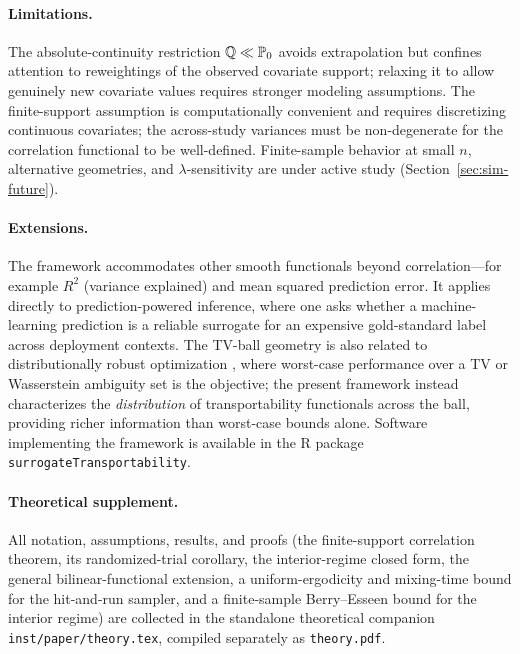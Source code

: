 \documentclass{article}
\newcommand{\PP}{\mathbb{P}}
\begin{document}
\paragraph{Limitations.}
The absolute-continuity restriction $\Q \ll \PP_0$ avoids extrapolation but
confines attention to reweightings of the observed covariate support; relaxing it
to allow genuinely new covariate values requires stronger modeling assumptions.
The finite-support assumption is computationally convenient and requires
discretizing continuous covariates; the across-study variances must be
non-degenerate for the correlation functional to be well-defined. Finite-sample
behavior at small $n$, alternative geometries, and $\lambda$-sensitivity are under
active study (Section~\ref{sec:sim-future}).

\paragraph{Extensions.}
The framework accommodates other smooth functionals beyond correlation---for
example $R^2$ (variance explained) and mean squared prediction error. It applies
directly to prediction-powered inference, where one asks whether a machine-learning
prediction is a reliable surrogate for an expensive gold-standard label across
deployment contexts. The TV-ball geometry is also related to distributionally
robust optimization \citep{bentalnemirovski2013,esfahanikuhn2018}, where worst-case
performance over a TV or Wasserstein ambiguity set is the objective; the present
framework instead characterizes the \emph{distribution} of transportability
functionals across the ball, providing richer information than worst-case bounds alone.
Software implementing the framework is available in the R
package \texttt{surrogateTransportability}.

\paragraph{Theoretical supplement.} All notation, assumptions, results, and proofs
(the finite-support correlation theorem, its randomized-trial corollary, the
interior-regime closed form, the general bilinear-functional extension, a
uniform-ergodicity and mixing-time bound for the hit-and-run sampler, and a
finite-sample Berry--Esseen bound for the interior regime) are collected in the
standalone theoretical companion \texttt{inst/paper/theory.tex}, compiled
separately as \texttt{theory.pdf}.



\end{document}
